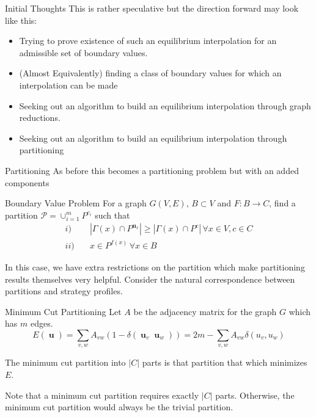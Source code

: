 \documentclass{beamer}
\DeclareMathOperator{\uu}{\mathbf{u}}
\begin{document}
\begin{frame}{Initial Thoughts}
	This is rather speculative but the direction forward may look like this:
	\begin{itemize}
		\item Trying to prove existence of such an equilibrium interpolation for an admissible set of boundary values. 
		\item (Almost Equivalently) finding a class of boundary values for which an interpolation can be made
		\item Seeking out an algorithm to build an equilibrium interpolation through graph reductions.  
		\item Seeking out an algorithm to build an equilibrium interpolation through partitioning
	\end{itemize}
\end{frame}
\begin{frame}{Partitioning}
	As before this becomes a partitioning problem but with an added components
	\begin{block}{Boundary Value Problem }
		For a graph $G(V,E)$, $B\subset V$ and $F:B\rightarrow C$, find a partition $\mathcal{P}=\cup_{i=1}^mP^{c_i}$ such that 
		\begin{equation}
			\begin{split}
				i)\quad & |\Gamma(x)\cap P^{\uu_x}|\geq |\Gamma(x)\cap P^{c}|\,\forall x\in V, c\in C \\
				ii)\quad &  x\in P^{f(x)}\,\forall x\in B 
			\end{split}
		\end{equation}
	\end{block}
	In this case, we have extra restrictions on the partition which make partitioning results themselves very helpful. Consider the natural correspondence between partitions and strategy profiles.
\end{frame}

\begin{frame}{Minimum Cut Partitioning}
	Let $A$ be the adjacency matrix for the graph $G$ which has $m$ edges. 
	\begin{equation}
		E(\uu) = \sum_{v,w}A_{vw}(1-\delta(\uu_v\uu_w))= 2m-\sum_{v,w}A_{vw}\delta(u_v,u_w)	\end{equation}
	
	The minimum cut partition into $|C|$ parts is that partition that which minimizes $E$. 
	
	Note that a minimum cut partition requires exactly $|C|$ parts. Otherwise, the minimum cut partition would always be the trivial partition. 
\end{frame}
\end{document}
